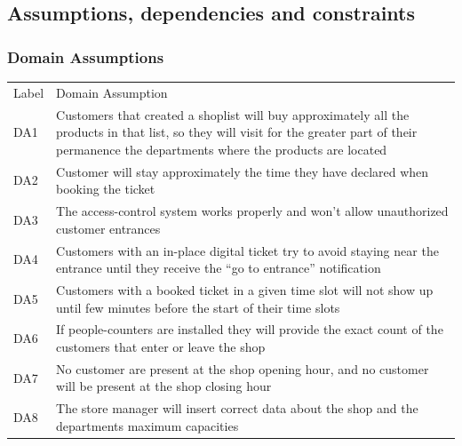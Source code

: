 \vfill
\pagebreak

\subsection{Assumptions, dependencies and constraints}
\subsubsection{Domain Assumptions}

\renewcommand{\arraystretch}{1.4}
\begin{tabular}{C{1cm}L{14.1cm}}
    Label & Domain Assumption                                                                                                                                                                                  \\

    DA1   & Customers that created a shoplist will buy approximately all the products in that list, so they will visit for the greater part of their permanence the departments where the products are located \\

    DA2   & Customer will stay approximately the time they have declared when booking the ticket                                                                                                               \\

    DA3   & The access-control system works properly and won't allow unauthorized customer entrances                                                                                                           \\

    DA4   & Customers with an in-place digital ticket try to avoid staying near the entrance until they receive the ``go to entrance'' notification                                                            \\

    DA5   & Customers with a booked ticket in a given time slot will not show up until few minutes before the start of their time slots                                                                        \\

    DA6   & If people-counters are installed they will provide the exact count of the customers that enter or leave the shop                                                                                   \\

    DA7   & No customer are present at the shop opening hour, and no customer will be present at the shop closing hour                                                                                         \\

    DA8   & The store manager will insert correct data about the shop and the departments maximum capacities                                                                                                   \\
\end{tabular}
\vfill

